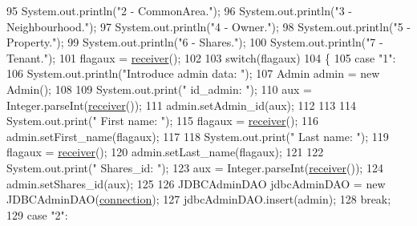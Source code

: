 \begin{DoxyCode}
95                 System.out.println(\textcolor{stringliteral}{"2 - CommonArea."});
96                 System.out.println(\textcolor{stringliteral}{"3 - Neighbourhood."});
97                 System.out.println(\textcolor{stringliteral}{"4 - Owner."});
98                 System.out.println(\textcolor{stringliteral}{"5 - Property."});
99                 System.out.println(\textcolor{stringliteral}{"6 - Shares."});
100                 System.out.println(\textcolor{stringliteral}{"7 - Tenant."});
101                 flagaux = \mbox{\hyperlink{classcms_1_1_c_m_s_ad13be0e97a0bb295dcedd134942a79b4}{receiver}}();
102                 
103                 \textcolor{keywordflow}{switch}(flagaux)
104                 \{
105                     \textcolor{keywordflow}{case} \textcolor{stringliteral}{"1"}:
106                         System.out.println(\textcolor{stringliteral}{"Introduce admin data: "});
107                         Admin admin = \textcolor{keyword}{new} Admin();
108                         
109                         System.out.print(\textcolor{stringliteral}{"    id\_admin: "});
110                         aux =  Integer.parseInt(\mbox{\hyperlink{classcms_1_1_c_m_s_ad13be0e97a0bb295dcedd134942a79b4}{receiver}}());
111                         admin.setAdmin\_id(aux);
112                         
113                         
114                         System.out.print(\textcolor{stringliteral}{"    First name: "});
115                         flagaux = \mbox{\hyperlink{classcms_1_1_c_m_s_ad13be0e97a0bb295dcedd134942a79b4}{receiver}}();
116                         admin.setFirst\_name(flagaux);
117                         
118                         System.out.print(\textcolor{stringliteral}{"    Last name: "});
119                         flagaux = \mbox{\hyperlink{classcms_1_1_c_m_s_ad13be0e97a0bb295dcedd134942a79b4}{receiver}}();
120                         admin.setLast\_name(flagaux);
121                         
122                         System.out.print(\textcolor{stringliteral}{"    Shares\_id: "});
123                         aux =  Integer.parseInt(\mbox{\hyperlink{classcms_1_1_c_m_s_ad13be0e97a0bb295dcedd134942a79b4}{receiver}}());
124                         admin.setShares\_id(aux);
125                         
126                         JDBCAdminDAO jdbcAdminDAO = \textcolor{keyword}{new} JDBCAdminDAO(\mbox{\hyperlink{classcms_1_1_c_m_s_afc28cfd2c4356509b85775219b7b1e05}{connection}});
127                         jdbcAdminDAO.insert(admin);
128                     \textcolor{keywordflow}{break};
129                     \textcolor{keywordflow}{case} \textcolor{stringliteral}{"2"}:

\end{DoxyCode}
